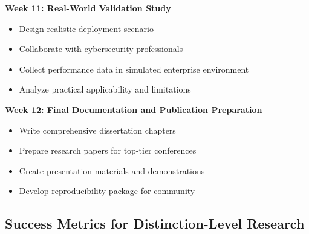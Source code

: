 \documentclass[12pt,a4paper]{article}
\begin{document}
\textbf{Week 11: Real-World Validation Study}
\begin{itemize}
    \item Design realistic deployment scenario
    \item Collaborate with cybersecurity professionals
    \item Collect performance data in simulated enterprise environment
    \item Analyze practical applicability and limitations
\end{itemize}

\textbf{Week 12: Final Documentation and Publication Preparation}
\begin{itemize}
    \item Write comprehensive dissertation chapters
    \item Prepare research papers for top-tier conferences
    \item Create presentation materials and demonstrations
    \item Develop reproducibility package for community
\end{itemize}

\subsection{Success Metrics for Distinction-Level Research}
\end{document}
